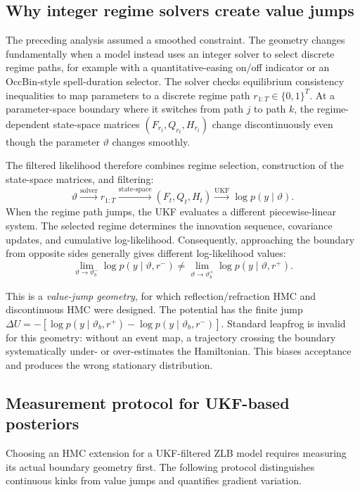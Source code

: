 \documentclass[11pt]{article}
\begin{document}
\subsection{Why integer regime solvers create value jumps}\label{sec:integer-regime-jumps}

The preceding analysis assumed a smoothed constraint. The geometry changes fundamentally when a model instead uses an integer solver to select discrete regime paths, for example with a quantitative-easing on/off indicator or an OccBin-style spell-duration selector. The solver checks equilibrium consistency inequalities to map parameters to a discrete regime path $r_{1:T}\in\{0,1\}^T$. At a parameter-space boundary where it switches from path $j$ to path $k$, the regime-dependent state-space matrices $(F_{r_t},
Q_{r_t}, H_{r_t})$ change discontinuously even though the parameter $\vartheta$ changes smoothly.

The filtered likelihood therefore combines regime selection, construction of the state-space matrices, and filtering:
\[
 \vartheta \xrightarrow{\text{solver}} r_{1:T}
          \xrightarrow{\text{state-space}} (F_t, Q_t, H_t)
          \xrightarrow{\text{UKF}} \log p(y\mid\vartheta).
\]
When the regime path jumps, the UKF evaluates a different piecewise-linear system. The selected regime determines the innovation sequence, covariance updates, and cumulative log-likelihood. Consequently, approaching the boundary from opposite sides generally gives different log-likelihood values:
\[
 \lim_{\vartheta\to\vartheta_b^-}\log p(y\mid\vartheta, r^-)
 \ne \lim_{\vartheta\to\vartheta_b^+}\log p(y\mid\vartheta, r^+).
\]

This is a \emph{value-jump geometry}, for which reflection/refraction HMC and discontinuous HMC were designed. The potential has the finite jump
$\Delta U = -[\log p(y\mid\vartheta_b,r^+) - \log p(y\mid\vartheta_b,r^-)]$.
Standard leapfrog is invalid for this geometry: without an event map, a trajectory crossing the boundary systematically under- or over-estimates the Hamiltonian. This biases acceptance and produces the wrong stationary distribution.

\subsection{Measurement protocol for UKF-based posteriors}\label{sec:ukf-measurement}

Choosing an HMC extension for a UKF-filtered ZLB model requires measuring its actual boundary geometry first. The following protocol distinguishes continuous kinks from value jumps and quantifies gradient variation.
\end{document}
